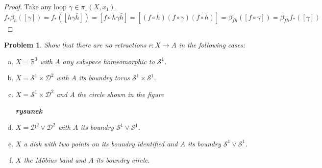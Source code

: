 \documentclass[11pt, a4paper, final]{amsart}
\newcommand{\R}{{\mathbb{R}}}
\newcommand\todo[1]{\textbf{\textcolor{redd}{#1}}}
\newcommand{\sphere}{\mathcal{S}}
\newcommand{\disk}{\mathcal{D}}
\numberwithin{theorem}{section}
\newtheorem{problem}[theorem]{Problem}
\theoremstyle{definition}
\theoremstyle{remark}
\begin{document}
\begin{proof}
    Take any loop $\gamma \in \pi_1(X, x_1)$.
    $$f_* \beta_h ([\gamma]) = f_*([h\gamma\bar{h}]) = [f\circ h\gamma\bar{h}] = [(f\circ h)(f \circ \gamma)\overline{(f \circ h)}] = \beta_{fh}([f \circ \gamma]) = \beta_{fh}f_*([\gamma])$$
\end{proof}

\begin{problem}\label{problem: 1.1.16}
    Show that there are no retractions $r:X \rightarrow A$ in the following cases:
    \begin{enumerate}[(a)]
        \item $X = \R^3$ with $A$ any subspace homeomorphic to $\sphere^1$.
        
        \item $X = \sphere^1 \times \disk^2$ with $A$ its boundry torus $\sphere^1 \times \sphere^1$.
        
        \item $X = \sphere^1 \times \disk^2$ and $A$ the circle shown in the figure

        \todo{rysunek}

        \item $X = \disk^2 \vee \disk^2$ with $A$ its boundry $\sphere^1 \vee \sphere^1$.

        \item $X$ a disk with two points on its boundry identified and $A$ its boundry $\sphere^1 \vee \sphere^1$.

        \item $X$ the M\"obius band and $A$ its boundry circle.
    \end{enumerate}
\end{problem}
\end{document}
